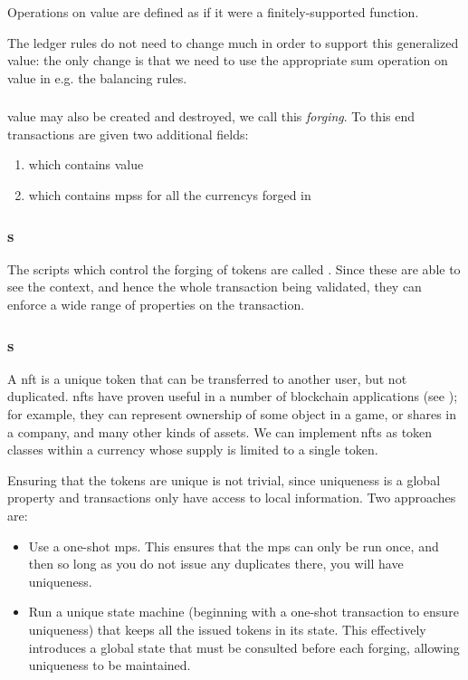 Operations on \gls{value} are defined as if it were a finitely-supported function.

The ledger rules do not need to change much in order to support this generalized \gls{value}: the only change is that we need to use the appropriate sum operation on \gls{value} in e.g. the balancing rules.

\subsubsection{}
\label{sec:forging}
\Gls{value} may also be created and destroyed, we call this \emph{\gls{forging}}.
To this end transactions are given two additional fields:
\begin{enumerate}
\item {} which contains \gls{value}
\item {} which contains \glspl{mps} for all the \glspl{currency} forged in 
\end{enumerate}

\subsubsection{s}
The \glspl{script} which control the forging of \glspl{token} are called .
Since these are able to see the \gls{context}, and hence the whole transaction being validated, they can enforce a wide range of properties on the transaction.

\subsubsection{s}
A \gls{nft} is a unique \gls{token} that can be transferred to another user, but not duplicated.
\Glspl{nft} have proven useful in a number of blockchain applications (see \textcite{ERC-721}); for example, they can represent ownership of some object in a game, or shares in a company, and many other kinds of assets.
We can implement \glspl{nft} as token classes within a \gls{currency} whose supply is limited to a single \gls{token}.

Ensuring that the tokens are unique is not trivial, since uniqueness is a global property and transactions only have access to local information.
Two approaches are:
\begin{itemize}
\item
  Use a \gls{one-shot} \gls{mps}.
  This ensures that the \gls{mps} can only be run once, and then so long as you do not issue any duplicates there, you will have uniqueness.
\item
  Run a unique state machine (beginning with a \gls{one-shot} transaction to ensure uniqueness) that keeps all the issued tokens in its state.
  This effectively introduces a global state that must be consulted before each forging, allowing uniqueness to be maintained.
\end{itemize}

